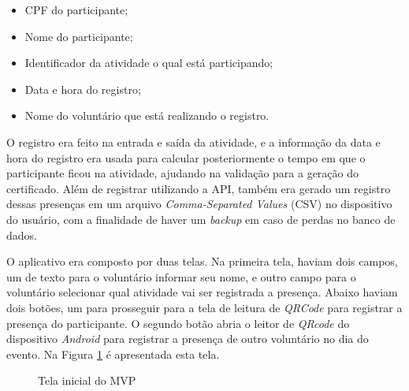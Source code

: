 \begin{itemize}
    \item CPF do participante;
    \item Nome do participante;
    \item Identificador da atividade o qual está participando;
    \item Data e hora do registro;
    \item Nome do voluntário que está realizando o registro.
\end{itemize}

O registro era feito na entrada e saída da atividade, e a informação da data e hora do registro era usada para calcular posteriormente o tempo em que o participante ficou na atividade, ajudando na validação para a geração do certificado. Além de registrar utilizando a API, também era gerado um registro dessas presenças em um arquivo \textit{Comma-Separated Values} (CSV) no dispositivo do usuário, com a finalidade de haver um \textit{backup} em caso de perdas no banco de dados.

O aplicativo era composto por duas telas. Na primeira tela, haviam dois campos, um de texto para o voluntário informar seu nome, e outro campo para o voluntário selecionar qual atividade vai ser registrada a presença. Abaixo haviam dois botões, um para prosseguir para a tela de leitura de \textit{QRCode} para registrar a presença do participante. O segundo botão abria o leitor de \textit{QRcode} do dispositivo \textit{Android} para registrar a presença de outro voluntário no dia do evento. Na Figura \ref{fig:mvp1} é apresentada esta tela.

\begin{figure}[H]
    \centering
    \caption{Tela inicial do MVP} 
    \label{fig:mvp1}
\end{figure}

